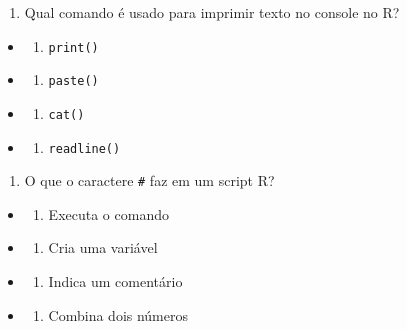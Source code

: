\documentclass[
]{book}
\providecommand{\tightlist}{%
  \setlength{\itemsep}{0pt}\setlength{\parskip}{0pt}}
\begin{document}
\begin{enumerate}
\def\labelenumi{\arabic{enumi}.}
\setcounter{enumi}{1}
\tightlist
\item
  Qual comando é usado para imprimir texto no console no R?
\end{enumerate}

\begin{itemize}
\tightlist
\item
  \begin{enumerate}
  \def\labelenumi{\alph{enumi})}
  \tightlist
  \item
    \texttt{print()}
  \end{enumerate}
\item
  \begin{enumerate}
  \def\labelenumi{\alph{enumi})}
  \setcounter{enumi}{1}
  \tightlist
  \item
    \texttt{paste()}
  \end{enumerate}
\item
  \begin{enumerate}
  \def\labelenumi{\alph{enumi})}
  \setcounter{enumi}{2}
  \tightlist
  \item
    \texttt{cat()}
  \end{enumerate}
\item
  \begin{enumerate}
  \def\labelenumi{\alph{enumi})}
  \setcounter{enumi}{3}
  \tightlist
  \item
    \texttt{readline()}
  \end{enumerate}
\end{itemize}

\begin{enumerate}
\def\labelenumi{\arabic{enumi}.}
\setcounter{enumi}{2}
\tightlist
\item
  O que o caractere \texttt{\#} faz em um script R?
\end{enumerate}

\begin{itemize}
\tightlist
\item
  \begin{enumerate}
  \def\labelenumi{\alph{enumi})}
  \tightlist
  \item
    Executa o comando
  \end{enumerate}
\item
  \begin{enumerate}
  \def\labelenumi{\alph{enumi})}
  \setcounter{enumi}{1}
  \tightlist
  \item
    Cria uma variável
  \end{enumerate}
\item
  \begin{enumerate}
  \def\labelenumi{\alph{enumi})}
  \setcounter{enumi}{2}
  \tightlist
  \item
    Indica um comentário
  \end{enumerate}
\item
  \begin{enumerate}
  \def\labelenumi{\alph{enumi})}
  \setcounter{enumi}{3}
  \tightlist
  \item
    Combina dois números
  \end{enumerate}
\end{itemize}
\end{document}
